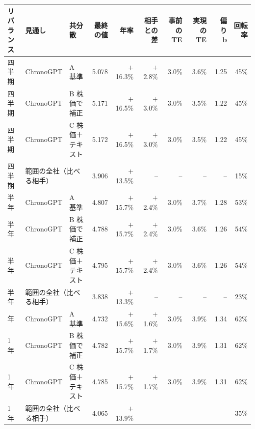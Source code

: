 \begin{tabular}{@{}lllrrrrrrr@{}}
\toprule
リバランス & 見通し & 共分散 & 最終の値 & 年率 & 相手との差 & 事前の TE & 実現の TE & 偏り b & 回転率 \\
\midrule
四半期 & ChronoGPT & A 基準 & 5.078 & $+$16.3\% & $+$2.8\% & 3.0\% & 3.6\% & 1.25 & 45\% \\
四半期 & ChronoGPT & B 株価で補正 & 5.171 & $+$16.5\% & $+$3.0\% & 3.0\% & 3.5\% & 1.22 & 45\% \\
四半期 & ChronoGPT & C 株価＋テキスト & 5.172 & $+$16.5\% & $+$3.0\% & 3.0\% & 3.5\% & 1.22 & 45\% \\
四半期 & \multicolumn{2}{l}{範囲の全社（比べる相手）} & 3.906 & $+$13.5\% & -- & -- & -- & -- & 15\% \\
\addlinespace
半年 & ChronoGPT & A 基準 & 4.807 & $+$15.7\% & $+$2.4\% & 3.0\% & 3.7\% & 1.28 & 53\% \\
半年 & ChronoGPT & B 株価で補正 & 4.788 & $+$15.7\% & $+$2.4\% & 3.0\% & 3.6\% & 1.26 & 54\% \\
半年 & ChronoGPT & C 株価＋テキスト & 4.795 & $+$15.7\% & $+$2.4\% & 3.0\% & 3.6\% & 1.26 & 54\% \\
半年 & \multicolumn{2}{l}{範囲の全社（比べる相手）} & 3.838 & $+$13.3\% & -- & -- & -- & -- & 23\% \\
\addlinespace
1 年 & ChronoGPT & A 基準 & 4.732 & $+$15.6\% & $+$1.6\% & 3.0\% & 3.9\% & 1.34 & 62\% \\
1 年 & ChronoGPT & B 株価で補正 & 4.782 & $+$15.7\% & $+$1.7\% & 3.0\% & 3.9\% & 1.31 & 62\% \\
1 年 & ChronoGPT & C 株価＋テキスト & 4.785 & $+$15.7\% & $+$1.7\% & 3.0\% & 3.9\% & 1.31 & 62\% \\
1 年 & \multicolumn{2}{l}{範囲の全社（比べる相手）} & 4.065 & $+$13.9\% & -- & -- & -- & -- & 35\% \\
\bottomrule
\end{tabular}
